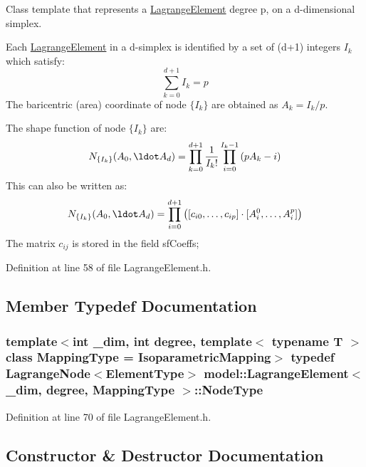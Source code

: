 Class template that represents a \hyperlink{classmodel_1_1_lagrange_element}{Lagrange\+Element} degree p, on a d-\/dimensional simplex.

Each \hyperlink{classmodel_1_1_lagrange_element}{Lagrange\+Element} in a d-\/simplex is identified by a set of (d+1) integers $I_k$ which satisfy\+: \[ \sum_{k=0}^{d+1}I_k=p \] The baricentric (area) coordinate of node $\{I_k\}$ are obtained as $A_k=I_k/p$.

The shape function of node $\{I_k\}$ are\+: \[ N_{\{I_k\}}(A_0,\ldot A_{d})=\prod_{k=0}^{d+1}\frac{1}{I_k!}\prod_{i=0}^{I_k-1}\left(pA_k-i\right) \] This can also be written as\+: \[ N_{\{I_k\}}(A_0,\ldot A_{d})=\prod_{i=0}^{d+1}\left([c_{i0},\ldots,c_{ip}]\cdot[A_i^0,\ldots,A_i^p]\right) \] The matrix $c_{ij}$ is stored in the field sf\+Coeffs; 

Definition at line 58 of file Lagrange\+Element.\+h.



\subsection{Member Typedef Documentation}
\hypertarget{classmodel_1_1_lagrange_element_a112bda9c061442a6c52f06c61e3ab123}{}
\subsubsection[{Node\+Type}]{\setlength{\rightskip}{0pt plus 5cm}template$<$int \+\_\+dim, int degree, template$<$ typename T $>$ class Mapping\+Type = Isoparametric\+Mapping$>$ typedef {\bf Lagrange\+Node}$<${\bf Element\+Type}$>$ {\bf model\+::\+Lagrange\+Element}$<$ \+\_\+dim, degree, Mapping\+Type $>$\+::{\bf Node\+Type}}\label{classmodel_1_1_lagrange_element_a112bda9c061442a6c52f06c61e3ab123}


Definition at line 70 of file Lagrange\+Element.\+h.



\subsection{Constructor \& Destructor Documentation}
\hypertarget{classmodel_1_1_lagrange_element_ab8c379ee777448b1a27ff30b970a5feb}{}
